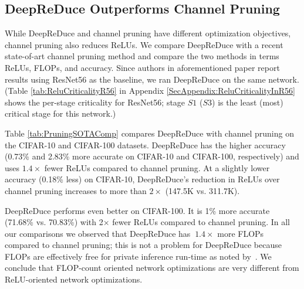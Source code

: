 \subsection{DeepReDuce Outperforms Channel Pruning}

While DeepReDuce and channel pruning have different optimization objectives, channel pruning also reduces ReLUs. 
We compare DeepReDuce  with a recent state-of-art channel pruning method \cite{he2020learning} and compare the two methods in terms  ReLUs, FLOPs, and accuracy. 
Since authors in aforementioned paper report results using ResNet56 as the baseline, we ran DeepReDuce on the same network. 
(Table \ref{tab:ReluCriticalityR56} in Appendix \ref{SecAppendix:ReluCriticalityInR56} shows the per-stage criticality for ResNet56; 
stage $S1$ ($S3$) is the least (most) critical stage for this network.)

Table \ref{tab:PruningSOTAComp} compares DeepReDuce with channel pruning on the CIFAR-10 and CIFAR-100 datasets.  DeepReDuce has the higher accuracy (0.73\% and 2.83\% more accurate on CIFAR-10 and CIFAR-100, respectively) and uses $1.4\times$ fewer ReLUs compared to channel pruning. At a slightly lower accuracy (0.18\% less) on CIFAR-10, 
DeepReDuce's reduction in ReLUs over channel pruning increases to more than $2\times$ (147.5K vs. 311.7K).

DeepReDuce performs even better on CIFAR-100. 
It is 1\% more accurate (71.68\% vs. 70.83\%) with 2$\times$ fewer ReLUs compared to channel pruning. 
In all our comparisons we observed that DeepReDuce has $~1.4\times$ more FLOPs compared to channel pruning; 
this is not a problem for DeepReDuce because FLOPs are effectively free for private inference run-time as noted by~\cite{ghodsi2020cryptonas}.
We conclude that FLOP-count oriented network optimizations are very different from ReLU-oriented network optimizations.





%
%
%
%

